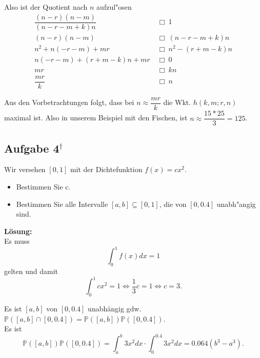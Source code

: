 \documentclass[11pt,a4paper,ngerman]{article}
\newcommand{\Prob}{\mathbb{P}}
\newcommand{\alex}{$^\dagger$}
\begin{document}
Also ist der Quotient nach $n$ aufzul"osen
\begin{align}
  \dfrac{(n-r)(n-m)}{(n-r-m+k)n} &\ \Box\  1 \\
  (n-r)(n-m) &\ \Box\  (n-r-m+k)n \\
  n^2 + n(-r-m) + mr &\ \Box\  n^2 - (r+m-k)n \\
  n(-r-m) + (r+m-k)n + mr &\ \Box\  0 \\
  mr &\ \Box\  kn \\
  \dfrac{mr}{k} &\ \Box\  n
\end{align}

Aus den Vorbetrachtungen folgt, dass bei $n \approx \dfrac{mr}{k}$ die Wkt.
$h(k,m; r,n)$ maximal ist. Also in unserem Beispiel mit den Fischen, ist $n
\approx \dfrac{15*25}{3} = 125$.

\subsection*{Aufgabe 4\alex}

Wir versehen $[0, 1]$ mit der Dichtefunktion $f(x) = cx^2$.
\begin{itemize}
  \item Bestimmen Sie c.
  \item Bestimmen Sie alle Intervalle $[a, b] \subseteq [0, 1]$, die von $[0,
  0.4]$ unabh"angig sind.

\end{itemize}

\textbf{Lösung:}\\

Es muss
\[
    \int_0^1 f(x) dx = 1
\] gelten und damit
\[
    \int_0^1 c x^2 = 1 \Leftrightarrow \frac{1}{3}c = 1 \Leftrightarrow c = 3.
\]

Es ist $[a,b]$ von $[0,0.4]$ unabhängig gdw. $\Prob([a,b] \cap [0,0.4]) = \Prob([a,b]) \Prob([0,0.4])$.\\
Es ist
\[
    \Prob([a,b]) \Prob([0,0.4]) = \int_a^b 3x^2 dx \cdot \int_0^{0.4} 3x^2 dx = 0.064 (b^3 - a^3).
\]
\end{document}
